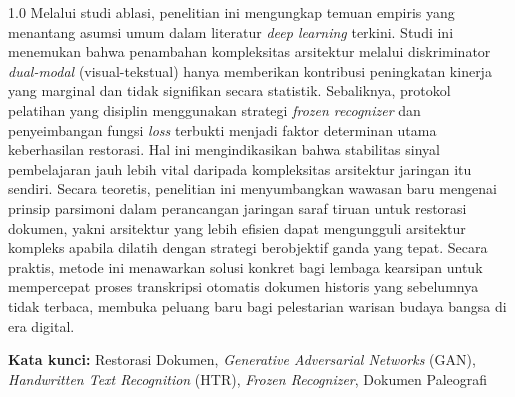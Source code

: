 \begin{spacing}{1.0}
    Melalui studi ablasi, penelitian ini mengungkap temuan empiris yang menantang asumsi umum dalam literatur \textit{deep learning} terkini. Studi ini menemukan bahwa penambahan kompleksitas arsitektur melalui diskriminator \textit{dual-modal} (visual-tekstual) hanya memberikan kontribusi peningkatan kinerja yang marginal dan tidak signifikan secara statistik. Sebaliknya, protokol pelatihan yang disiplin menggunakan strategi \textit{frozen recognizer} dan penyeimbangan fungsi \textit{loss} terbukti menjadi faktor determinan utama keberhasilan restorasi. Hal ini mengindikasikan bahwa stabilitas sinyal pembelajaran jauh lebih vital daripada kompleksitas arsitektur jaringan itu sendiri.
    Secara teoretis, penelitian ini menyumbangkan wawasan baru mengenai prinsip parsimoni dalam perancangan jaringan saraf tiruan untuk restorasi dokumen, yakni arsitektur yang lebih efisien dapat mengungguli arsitektur kompleks apabila dilatih dengan strategi berobjektif ganda yang tepat. Secara praktis, metode ini menawarkan solusi konkret bagi lembaga kearsipan untuk mempercepat proses transkripsi otomatis dokumen historis yang sebelumnya tidak terbaca, membuka peluang baru bagi pelestarian warisan budaya bangsa di era digital.
    
\end{spacing}

\vspace{2\baselineskip}

\noindent
\textbf{Kata kunci:} Restorasi Dokumen, \textit{Generative Adversarial Networks} (GAN), \textit{Handwritten Text Recognition} (HTR), \textit{Frozen Recognizer}, Dokumen Paleografi

% 